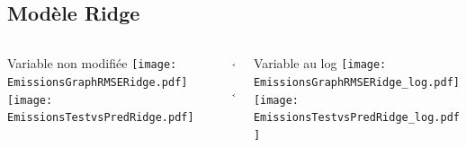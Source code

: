 \documentclass[8pt,aspectratio=169,hyperref={unicode=true}]{beamer}
\begin{document}
\subsection{Modèle Ridge}
\begin{frame}{\insertsubsection}
  \begin{columns}[t]
    \begin{column}{.33\textwidth}
      \centering Variable non modifiée
      \texttt{[image: EmissionsGraphRMSERidge.pdf]}
      \texttt{[image: EmissionsTestvsPredRidge.pdf]}
    \end{column}
    \begin{column}{.33\textwidth}
      $\Longleftarrow$
      \scriptsize
      {\centering
        }
      

      \normalsize
      $\Longleftarrow$

      \raggedleft{$\Longrightarrow$}
      \scriptsize
      {\centering
        }
      

      \normalsize
      \raggedleft{$\Longrightarrow$}
    \end{column}
    \begin{column}{.33\textwidth}
      \centering Variable au log
      \texttt{[image: EmissionsGraphRMSERidge\_log.pdf]}
      \texttt{[image: EmissionsTestvsPredRidge\_log.pdf]}
    \end{column}
  \end{columns}
\end{frame}
\end{document}
